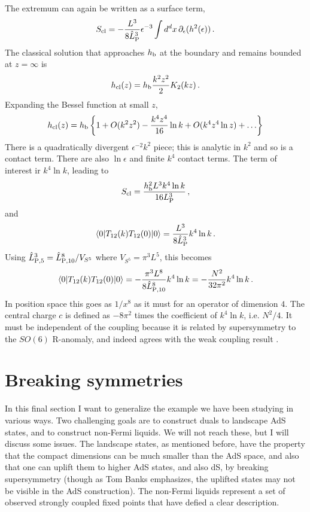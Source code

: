 \documentclass[12pt]{article}
\newcommand{\sect}[1]{\section{#1}\setcounter{equation}{0}}
\begin{document}
{The extremum can again be written as a surface term,
\begin{equation}
S_{\rm cl} =  -\frac{L^3}{8 \hat L_{\rm P}^{3}} \epsilon^{-3} \int d^dx\,  \partial_ \epsilon (h^2(\epsilon) ) \,.
\end{equation}
The classical solution that approaches $h_{\rm b}$ at the boundary and remains bounded at $z= \infty$ is 
\begin{equation}
h_{\rm cl}(z) =  h_{\rm b} \frac{k^2 z^2}{2} K_{2}(kz) \,.
\end{equation}
Expanding the Bessel function at small $z$,
\begin{equation}
h_{\rm cl}(z) = h_{\rm b} \left\{ 1 + O(k^2 z^2) -  \frac{k^4 z^4}{16}  \ln k +  O(k^4 z^4 \ln z) + \ldots \right\}
\end{equation}
There is a quadratically divergent $\epsilon^{-2} k^2$ piece; this is analytic in $k^2$ and so is a contact term.  There are also $\ln \epsilon$ and finite $k^4$ contact terms.  The term of interest ir $k^4 \ln k$, leading to 
\begin{equation}
S_{\rm cl} =  \frac{h^2_{\rm b} L^3 k^4 \ln k}{16 L_{\rm P}^{3}} \,,
\end{equation}
and
\begin{equation}
\langle 0 | T_{12}(k) T_{12}(0) | 0 \rangle =  \frac{L^3 }{8 \hat L_{\rm P}^{3}} k^4 \ln k \,.
\end{equation}
Using $\hat L_{\rm P,5}^{3} = \hat L_{\rm P,10}^{8}/V_{S^5}$ where $V_{ S^5} = \pi^3 L^5$, this becomes~\cite{GKP}
\begin{equation}
\langle 0 | T_{12}(k) T_{12}(0) | 0 \rangle =  -\frac{\pi^3 L^8 }{8 \hat L_{\rm P,10}^{8}} k^4 \ln k
= - \frac{N^2}{32 \pi^2} k^4 \ln k \,.
\end{equation}
In position space this goes as $1/x^8$ as it must for an operator of dimension $4$.  The central charge $c$ is defined as $-8\pi^2$ times the coefficient of $k^4 \ln k$, i.e. $N^2/4$.  It must be independent of the coupling because it is related by supersymmetry to the $SO(6)$ R-anomaly, and indeed agrees with the weak coupling result \cite{Gubser:1997se}.

\sect{Breaking symmetries}

In this final section I want to generalize the example we have been studying in various ways.  Two challenging goals are to construct duals to landscape AdS states, and to construct non-Fermi liquids.  We will not reach these, but I will discuss some issues.  The landscape states, as mentioned before, have the property that the compact dimensions can be much smaller than the AdS space, and also that one can uplift them to higher AdS states, and also dS, by breaking supersymmetry (though as Tom Banks emphasizes, the uplifted states may not be visible in the AdS construction).  The non-Fermi liquids represent a set of observed strongly coupled fixed points that have defied a clear description.

}
\end{document}
